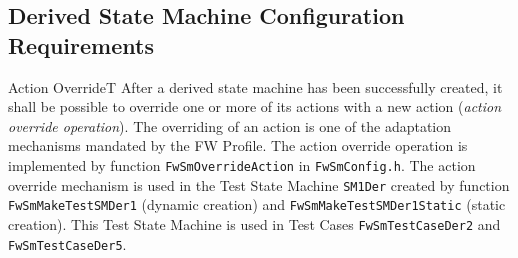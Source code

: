 \documentclass[requirements]{../fwprofile}
\begin{document}
\subsection{Derived State Machine Configuration Requirements}\label{req:configInterfaceDerivedSM}


\begin{fw_req}{Action Override}{T}
{After a derived state machine has been successfully created, 
it shall be possible to override one or more of its actions with a new action 
(\emph{action override operation}).}
{The overriding of an action is one of the adaptation mechanisms 
mandated by the FW Profile.}
{The action override operation is implemented by function 
\texttt{FwSmOverrideAction} in \texttt{FwSmConfig.h}.} 
{The action override mechanism is used in the Test State Machine 
\texttt{SM1Der} created by function 
\texttt{FwSmMakeTestSMDer1} (dynamic creation) and \texttt{FwSmMakeTestSMDer1Static} (static 
creation). 
This Test State Machine is used in Test Cases \texttt{FwSmTestCaseDer2} and
\texttt{FwSmTestCaseDer5}.}
\end{fw_req}
\end{document}
